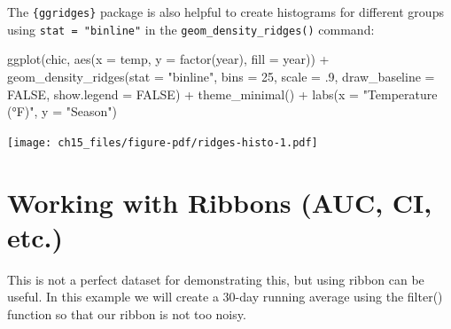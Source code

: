 \documentclass[
  letterpaper,
  DIV=11,
  numbers=noendperiod]{scrreprt}
\newenvironment{Shaded}{\begin{snugshade}}{\end{snugshade}}
\newcommand{\AttributeTok}[1]{\textcolor[rgb]{0.40,0.45,0.13}{#1}}
\newcommand{\ConstantTok}[1]{\textcolor[rgb]{0.56,0.35,0.01}{#1}}
\newcommand{\DecValTok}[1]{\textcolor[rgb]{0.68,0.00,0.00}{#1}}
\newcommand{\FunctionTok}[1]{\textcolor[rgb]{0.28,0.35,0.67}{#1}}
\newcommand{\NormalTok}[1]{\textcolor[rgb]{0.00,0.23,0.31}{#1}}
\newcommand{\OtherTok}[1]{\textcolor[rgb]{0.00,0.23,0.31}{#1}}
\newcommand{\SpecialCharTok}[1]{\textcolor[rgb]{0.37,0.37,0.37}{#1}}
\newcommand{\StringTok}[1]{\textcolor[rgb]{0.13,0.47,0.30}{#1}}
\begin{document}
The \texttt{\{ggridges\}} package is also helpful to create histograms
for different groups using \texttt{stat\ =\ "binline"} in the
\texttt{geom\_density\_ridges()} command:

\begin{Shaded}
\begin{Highlighting}[]
\FunctionTok{ggplot}\NormalTok{(chic, }\FunctionTok{aes}\NormalTok{(}\AttributeTok{x =}\NormalTok{ temp, }\AttributeTok{y =} \FunctionTok{factor}\NormalTok{(year), }\AttributeTok{fill =}\NormalTok{ year)) }\SpecialCharTok{+}
  \FunctionTok{geom\_density\_ridges}\NormalTok{(}\AttributeTok{stat =} \StringTok{"binline"}\NormalTok{, }\AttributeTok{bins =} \DecValTok{25}\NormalTok{, }\AttributeTok{scale =}\NormalTok{ .}\DecValTok{9}\NormalTok{,}
                      \AttributeTok{draw\_baseline =} \ConstantTok{FALSE}\NormalTok{, }\AttributeTok{show.legend =} \ConstantTok{FALSE}\NormalTok{) }\SpecialCharTok{+}
  \FunctionTok{theme\_minimal}\NormalTok{() }\SpecialCharTok{+}
  \FunctionTok{labs}\NormalTok{(}\AttributeTok{x =} \StringTok{"Temperature (°F)"}\NormalTok{, }\AttributeTok{y =} \StringTok{"Season"}\NormalTok{)}
\end{Highlighting}
\end{Shaded}

\texttt{[image: ch15\_files/figure-pdf/ridges-histo-1.pdf]}


\chapter{Working with Ribbons (AUC, CI, etc.)}\label{ribbons}

This is not a perfect dataset for demonstrating this, but using ribbon
can be useful. In this example we will create a 30-day running average
using the filter() function so that our ribbon is not too noisy.

\begin{Shaded}
\end{Shaded}
\end{document}
